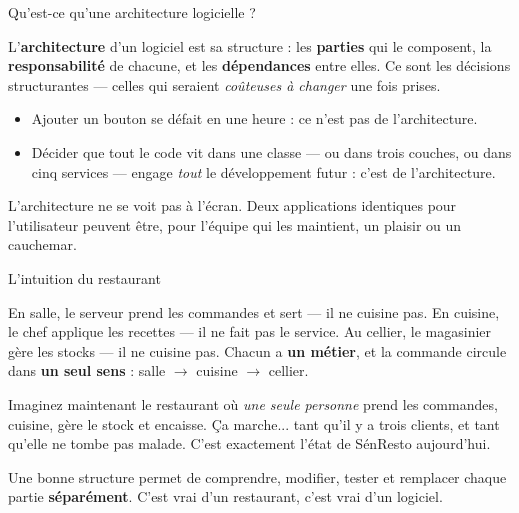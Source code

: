 \documentclass[aspectratio=169,11pt]{beamer}
\begin{document}
\begin{frame}{Qu'est-ce qu'une architecture logicielle ?}
\begin{ucaddef}[Définition]
{\small L'\textbf{architecture} d'un logiciel est sa structure : les \textbf{parties} qui le composent, la \textbf{responsabilité} de chacune, et les \textbf{dépendances} entre elles. Ce sont les décisions structurantes — celles qui seraient \emph{coûteuses à changer} une fois prises.}
\end{ucaddef}
\begin{itemize}\small
  \item Ajouter un bouton se défait en une heure : ce n'est pas de l'architecture.
  \item Décider que tout le code vit dans une classe — ou dans trois couches, ou dans cinq services — engage \emph{tout} le développement futur : c'est de l'architecture.
\end{itemize}
\begin{ucadret}[À retenir]
{\small L'architecture ne se voit pas à l'écran. Deux applications identiques pour l'utilisateur peuvent être, pour l'équipe qui les maintient, un plaisir ou un cauchemar.}
\end{ucadret}
\end{frame}

\begin{frame}{L'intuition du restaurant}
\begin{ucadex}
{\small En salle, le serveur prend les commandes et sert — il ne cuisine pas. En cuisine, le chef applique les recettes — il ne fait pas le service. Au cellier, le magasinier gère les stocks — il ne cuisine pas. Chacun a \textbf{un métier}, et la commande circule dans \textbf{un seul sens} : salle $\to$ cuisine $\to$ cellier.}
\end{ucadex}
\vskip2pt
{\small Imaginez maintenant le restaurant où \emph{une seule personne} prend les commandes, cuisine, gère le stock et encaisse. Ça marche... tant qu'il y a trois clients, et tant qu'elle ne tombe pas malade. C'est exactement l'état de SénResto aujourd'hui.}
\begin{ucadret}[À retenir]
{\small Une bonne structure permet de comprendre, modifier, tester et remplacer chaque partie \textbf{séparément}. C'est vrai d'un restaurant, c'est vrai d'un logiciel.}
\end{ucadret}
\end{frame}

\end{document}
